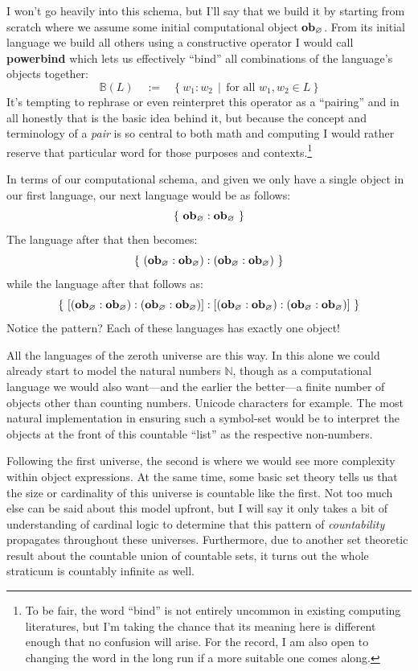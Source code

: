 \documentclass[twoside]{article}
\newcommand{\qdefeq}{\ensuremath{\quad :=\quad}}
\newcommand{\strong}[1]{{\bfseries #1}}
\newcommand{\bfmbox}[1]{\mbox{\bfseries #1}}
\begin{document}
I won't go heavily into this schema, but I'll say that we build it by starting from scratch where we assume some initial
computational object $ \bfmbox{ob}_\varnothing $. From its initial language we build all others using a constructive operator
I would call \strong{powerbind} which lets us effectively ``bind'' all combinations of the language's objects together:
$$ \mathbb{B}(L) \qdefeq \{\ w_1:w_2\ \ |\ \ \mbox{for all } w_1, w_2\in L\ \} $$
It's tempting to rephrase or even reinterpret this operator as a ``pairing'' and in all honestly that is the basic idea behind
it, but because the concept and terminology of a \emph{pair} is so central to both math and computing I would rather reserve
that particular word for those purposes and contexts.\footnote{To be fair, the word ``bind'' is not entirely uncommon in
existing computing literatures, but I'm taking the chance that its meaning here is different enough that no confusion
will arise. For the record, I am also open to changing the word in the long run if a more suitable one comes along.}

In terms of our computational schema, and given we only have a single object in our first language, our next language would
be as follows:
$$ \{\ \bfmbox{ob}_\varnothing:\bfmbox{ob}_\varnothing\ \} $$
The language after that then becomes:
$$ \{\ (\bfmbox{ob}_\varnothing:\bfmbox{ob}_\varnothing):(\bfmbox{ob}_\varnothing:\bfmbox{ob}_\varnothing)\ \} $$
while the language after that follows as:
$$ \{\ [(\bfmbox{ob}_\varnothing:\bfmbox{ob}_\varnothing):(\bfmbox{ob}_\varnothing:\bfmbox{ob}_\varnothing)]:
   [(\bfmbox{ob}_\varnothing:\bfmbox{ob}_\varnothing):(\bfmbox{ob}_\varnothing:\bfmbox{ob}_\varnothing)]\ \} $$
Notice the pattern? Each of these languages has exactly one object!

All the languages of the zeroth universe are this way. In this alone we could already start to model the natural numbers
$ \mathbb{N} $, though as a computational language we would also want---and the earlier the better---a finite number of
objects other than counting numbers. Unicode characters for example. The most natural implementation in ensuring such
a symbol-set would be to interpret the objects at the front of this countable ``list'' as the respective non-numbers.

Following the first universe, the second is where we would see more complexity within object expressions. At the same time,
some basic set theory tells us that the size or cardinality of this universe is countable like the first. Not too much else
can be said about this model upfront, but I will say it only takes a bit of understanding of cardinal logic to determine
that this pattern of \emph{countability} propagates throughout these universes. Furthermore, due to another set theoretic
result about the countable union of countable sets, it turns out the whole straticum is countably infinite as well.
\end{document}

